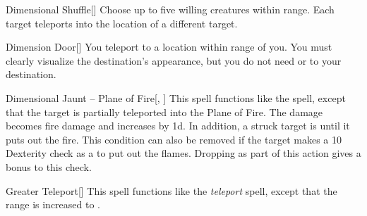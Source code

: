 \lowercase{\hypertarget{spell:Dimensional Shuffle}{}}\label{spell:Dimensional Shuffle}
\begin{apability}[\nth{2}]{\hypertarget{spell:Dimensional Shuffle}{Dimensional Shuffle}}[]
Choose up to five willing creatures within \rngmed range.
Each target teleports into the location of a different target.
\end{apability}
\vspace{0.25em}



\lowercase{\hypertarget{spell:Dimension Door}{}}\label{spell:Dimension Door}
\begin{apability}[\nth{3}]{\hypertarget{spell:Dimension Door}{Dimension Door}}[]
You teleport to a location within \rngext range of you.
You must clearly visualize the destination's appearance, but you do not need  or  to your destination.
\end{apability}
\vspace{0.25em}



\lowercase{\hypertarget{spell:Dimensional Jaunt -- Plane of Fire}{}}\label{spell:Dimensional Jaunt -- Plane of Fire}
\begin{apability}[\nth{3}]{\hypertarget{spell:Dimensional Jaunt -- Plane of Fire}{Dimensional Jaunt -- Plane of Fire}}[, ]
This spell functions like the  spell, except that the target is partially teleported into the Plane of Fire.
The damage becomes fire damage and increases by \plus1d.
In addition, a struck target is  until it puts out the fire.
This condition can also be removed if the target makes a  10 Dexterity check as a  to put out the flames.
Dropping  as part of this action gives a  bonus to this check.
\end{apability}
\vspace{0.25em}



\lowercase{\hypertarget{spell:Greater Teleport}{}}\label{spell:Greater Teleport}
\begin{apability}[\nth{3}]{\hypertarget{spell:Greater Teleport}{Greater Teleport}}[]
This spell functions like the \textit{teleport} spell, except that the range is increased to \rngext.
\end{apability}
\vspace{0.25em}



